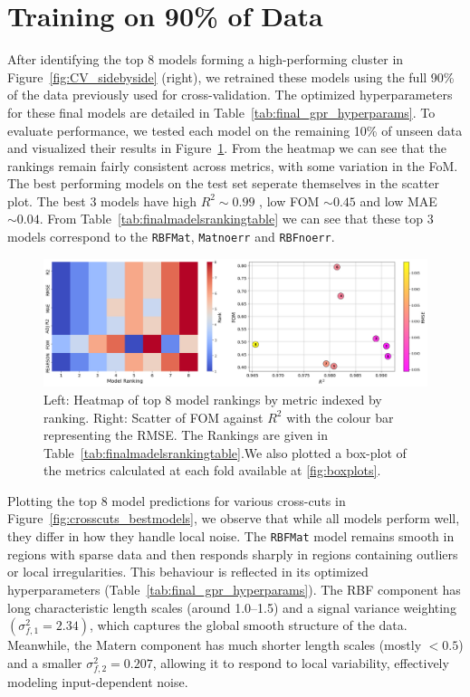 \documentclass{ucdgradtaughtthesis}
\begin{document}
\section{Training on 90\% of Data}
After identifying the top 8 models forming a high-performing cluster in Figure~\ref{fig:CV_sidebyside} (right),
we retrained these models using the full 90\% of the data previously used for cross-validation. The optimized hyperparameters for these final models are detailed in Table~\ref{tab:final_gpr_hyperparams}. 
To evaluate performance, we tested each model on the remaining 10\% of unseen data and visualized their results in Figure~\ref{fig:comparing_metrics}.
From the heatmap we can see that the rankings remain fairly consistent across metrics, with some variation in the FoM. The best performing models on the test set seperate themselves in the scatter plot. The best 3 models have high \(R^2 \sim 0.99\) , low FOM \(\sim 0.45\) and low MAE \(\sim 0.04\).
From Table~\ref{tab:finalmadelsrankingtable} we can see that these top 3 models correspond to the \texttt{RBFMat}, \texttt{Matnoerr} and \texttt{RBFnoerr}.
\begin{figure}[H]
    \centering
    \includegraphics[width=\textwidth]{LatexPlots/final_gps_plots/metric_of_finalists_comparison.png}
    \caption[Visualising the ranking of each model on the test data.]{Left: Heatmap of top 8 model rankings by metric indexed by ranking.
    Right: Scatter of FOM against \(R^2\) with the colour bar representing the RMSE.
    The Rankings are given in Table~\ref{tab:finalmadelsrankingtable}.We also plotted a box-plot of the metrics calculated at each fold available at \ref{fig:boxplots}. }
    \label{fig:comparing_metrics}
\end{figure}
Plotting the top 8 model predictions for various cross-cuts in Figure~\ref{fig:crosscuts_bestmodels}, we observe that while all models perform well, they differ in how they handle local noise.
The \texttt{RBFMat} model remains smooth in regions with sparse data and then responds sharply in regions containing outliers or local irregularities.
This behaviour is reflected in its optimized hyperparameters (Table~\ref{tab:final_gpr_hyperparams}). The RBF component has long characteristic length scales (around 1.0--1.5) and a signal variance weighting \((\sigma_{f,1}^2 =2.34)\),
which captures the global smooth structure of the data. Meanwhile, the Matern component has much shorter length scales (mostly $< 0.5$) and a smaller \(\sigma_{f,2}^2 = 0.207\), allowing it to respond to local variability, effectively modeling input-dependent noise.
%
\end{document}
